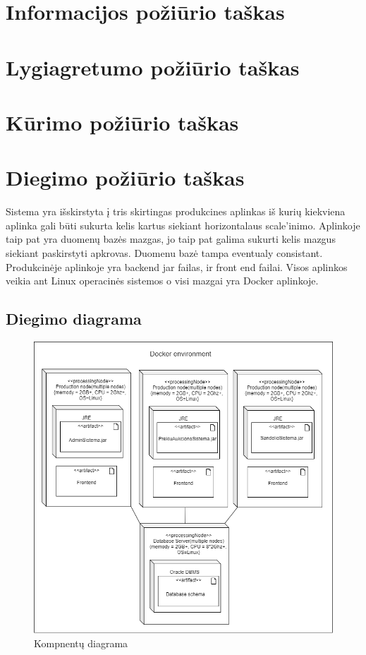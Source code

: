 \documentclass{VUMIFPSmagistrinis}
\begin{document}
		\section{Informacijos požiūrio taškas}
		\section{Lygiagretumo požiūrio taškas}
		\section{Kūrimo požiūrio taškas}
		\section{Diegimo požiūrio taškas}
			Sistema yra išskirstyta į tris skirtingas produkcines aplinkas iš kurių kiekviena aplinka gali būti sukurta kelis kartus siekiant horizontalaus scale'inimo.
			Aplinkoje taip pat yra duomenų bazės mazgas, jo taip pat galima sukurti kelis mazgus siekiant paskirstyti apkrovas.
			Duomenu bazė tampa eventualy consistant.
			Produkcinėje aplinkoje yra backend jar failas, ir front end failai.
			Visos aplinkos veikia ant Linux operacinės sistemos o visi mazgai yra Docker aplinkoje.
			\subsection{Diegimo diagrama}
				\begin{figure}[H]
				\centering
				\includegraphics[scale=0.7]{img/deployment}
				\caption{Kompnentų diagrama} %
				\label{img:text}
				\end{figure}
\end{document}

